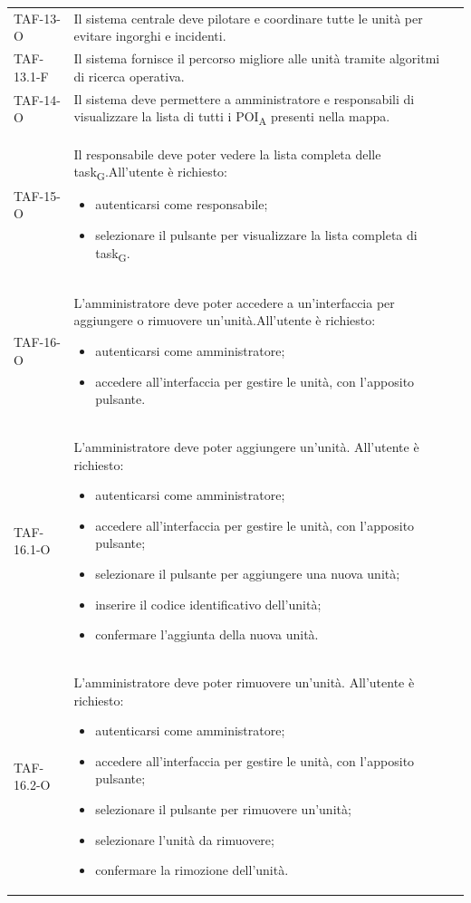 \begin{longtable}{ >{\centering}p{} >{}p{}
		>{\centering}p{}}
	TAF-13-O & Il sistema centrale deve pilotare e coordinare tutte le unità per evitare ingorghi e incidenti. & 0\tabularnewline

	TAF-13.1-F & Il sistema fornisce il percorso migliore alle unità tramite algoritmi di ricerca operativa. & 0\tabularnewline

	TAF-14-O & Il sistema deve permettere a amministratore e responsabili di visualizzare la lista di tutti i \acrshort{POI}\textsubscript{A} presenti nella mappa. & 0\tabularnewline

	TAF-15-O & Il responsabile deve poter vedere la lista completa delle \gls{task}\textsubscript{G}.\newline All'utente è richiesto:\begin{itemize} \item autenticarsi come responsabile; \item selezionare il pulsante per visualizzare la lista completa di \gls{task}\textsubscript{G}. \end{itemize} & 0\tabularnewline

	TAF-16-O & L'amministratore deve poter accedere a un'interfaccia per aggiungere o rimuovere un'unità.\newline All'utente è richiesto: \begin{itemize} \item autenticarsi come amministratore; \item accedere all'interfaccia per gestire le unità, con l'apposito pulsante.\end{itemize} & 0\tabularnewline

	TAF-16.1-O & L'amministratore deve poter aggiungere un'unità. \newline All'utente è richiesto: \begin{itemize} \item autenticarsi come amministratore; \item accedere all'interfaccia per gestire le unità, con l'apposito pulsante; \item selezionare il pulsante per aggiungere una nuova unità; \item inserire il codice identificativo dell'unità; \item confermare l'aggiunta della nuova unità.\end{itemize} & 0\tabularnewline

	TAF-16.2-O & L'amministratore deve poter rimuovere un'unità. \newline All'utente è richiesto: \begin{itemize} \item autenticarsi come amministratore; \item accedere all'interfaccia per gestire le unità, con l'apposito pulsante; \item selezionare il pulsante per rimuovere un'unità; \item selezionare l'unità da rimuovere; \item confermare la rimozione dell'unità.\end{itemize} & 0\tabularnewline



\end{longtable}

